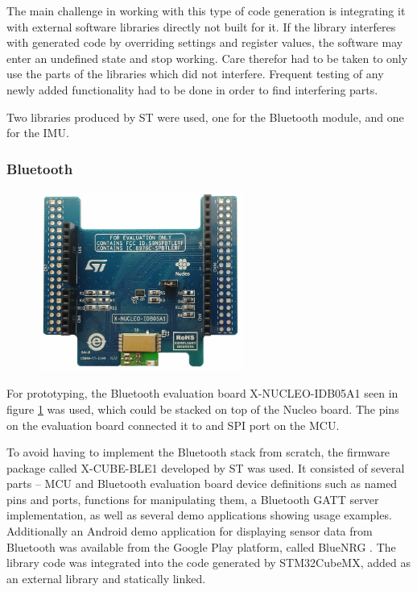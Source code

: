 The main challenge in working with this type of code generation is integrating it with external software libraries directly not built for it. If the library interferes with generated code by overriding settings and register values, the software may enter an undefined state and stop working. Care therefor had to be taken to only use the parts of the libraries which did not interfere. Frequent testing of any newly added functionality had to be done in order to find interfering parts.

Two libraries produced by ST were used, one for the Bluetooth module, and one for the IMU.

\subsubsection{Bluetooth}
\label{bluetooth}

\begin{figure}[H]
\centering
\includegraphics[width=0.6\textwidth]{Figures/x-nucleo-idb05a1.jpg}
\caption{}
\label{bt-eval-board}
\end{figure}

For prototyping, the Bluetooth evaluation board X-NUCLEO-IDB05A1 \cite{x-nucleo-idb05a1} seen in figure \ref{bt-eval-board} was used, which could be stacked on top of the Nucleo board. The pins on the evaluation board connected it to and SPI port on the MCU.

To avoid having to implement the Bluetooth stack from scratch, the firmware package called X-CUBE-BLE1 \cite{x-cube-ble1} developed by ST was used. It consisted of several parts -- MCU and Bluetooth evaluation board device definitions such as named pins and ports, functions for manipulating them, a Bluetooth GATT server implementation, as well as several demo applications showing usage examples. Additionally an Android demo application for displaying sensor data from Bluetooth was available from the Google Play platform, called BlueNRG \cite{bluenrg-app}. The library code was integrated into the code generated by STM32CubeMX, added as an external library and statically linked.

